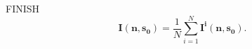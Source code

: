 \begin{minipage}{6cm}
\begin{sf}
{\Large FINISH}
\[
\mathbf{I(n,s_0)}=\frac{1}{N}\displaystyle\sum_{i=1}^N\mathbf{I^i(n,s_0)}.\]
\end{sf}
\end{minipage}
